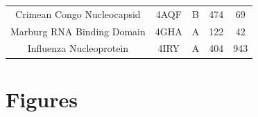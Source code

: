 \documentclass[12pt]{article}
\begin{document}
\begin{table}[htbp]
\begin{center}
\begin{tabular}{c c c c c}
                        Crimean Congo Nucleocapsid      & 4AQF           & B         & 474                & 69          \\ %
                        Marburg RNA Binding Domain      & 4GHA           & A         & 122                & 42          \\ %
                        Influenza Nucleoprotein         & 4IRY           & A         & 404                & 943         \\ %
                        \hline
                        \hline
                \end{tabular}
        \end{center}
\end{table}

\cleardoublepage

\section*{Figures}
\end{document}
